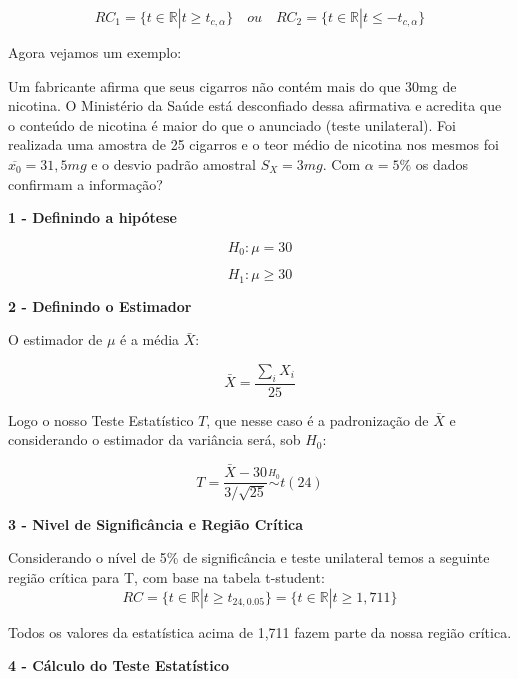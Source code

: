 \documentclass[
  letterpaper,
  DIV=11,
  numbers=noendperiod]{scrartcl}
\begin{document}
\[RC_1=\{t \in \mathbb{R} | t\geq  t_{c,\alpha}\} \quad ou \quad RC_2=\{t \in \mathbb{R} |t\leq -t_{c,\alpha} \}\]

Agora vejamos um exemplo:

\begin{exemplo}

Um fabricante afirma que seus cigarros não contém mais do que 30mg de
nicotina. O Ministério da Saúde está desconfiado dessa afirmativa e
acredita que o conteúdo de nicotina é maior do que o anunciado (teste
unilateral). Foi realizada uma amostra de 25 cigarros e o teor médio de
nicotina nos mesmos foi \(\overline{x_0}=31,5mg\) e o desvio padrão
amostral \(S_X=3mg\). Com \(\alpha=5\%\) os dados confirmam a
informação?

\end{exemplo}

\vspace{0.5cm}

\textbf{1 - Definindo a hipótese}

\[H_0: \mu=30\]

\[H_1: \mu\geq30\]

\vspace{0.5cm}

\textbf{2 - Definindo o Estimador}

O estimador de \(\mu\) é a média \(\bar{X}\):

\[\bar{X}=\frac{\sum_iX_i}{25}\]

Logo o nosso Teste Estatístico \(T\), que nesse caso é a padronização de
\(\bar{X}\) e considerando o estimador da variância será, sob \(H_0\):

\[T=\frac{\bar{X}-30}{3/\sqrt{25}}\overset{H_0}{\sim} t(24)\]

\vspace{0.5cm}

\textbf{3 - Nivel de Significância e Região Crítica}

Considerando o nível de 5\% de significância e teste unilateral temos a
seguinte região crítica para T, com base na tabela t-student:\\

\[RC=\{t \in \mathbb{R} |t\geq t_{24,0.05} \}= \{t \in \mathbb{R} |t\geq 1,711 \}\]

Todos os valores da estatística acima de 1,711 fazem parte da nossa
região crítica.

\vspace{0.5cm}

\textbf{4 - Cálculo do Teste Estatístico}
\end{document}
